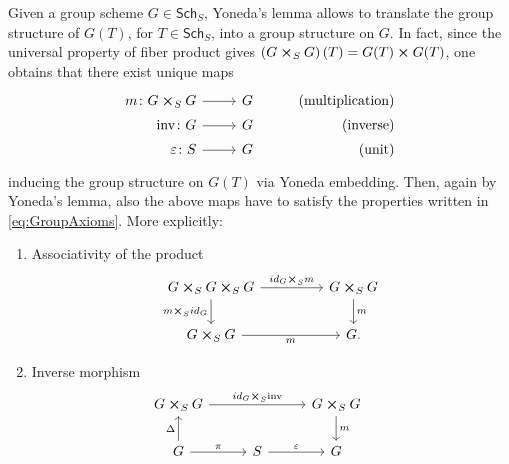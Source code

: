 \documentclass[../Main]{subfiles}
\begin{document}
\begin{rem}[]\label{rem:StructuralMorphisms}
	Given a group scheme $G \in \mathsf{Sch}_{ S }$, Yoneda's lemma allows to translate
	the group structure of $G(T)$, for $T \in \mathsf{Sch}_{ S }$, into a group structure on $G$.
	In fact, since the universal property of
	fiber product gives $\left( G \cross_{ S } G \right)(T) = G(T) \cross G(T)$,
	one obtains that there exist unique maps
	\begin{equation}
			\begin{tikzcd}[row sep = 0ex
         ,/tikz/column 1/.append style={anchor=base east}
         ,/tikz/column 2/.append style={anchor=base west}
         ,/tikz/column 3/.append style={anchor=base east}]
			m\colon G \cross_{ S } G \arrow[r, "", rightarrow] &
			G & \text{(multiplication)} \\
			\mathrm{inv}\colon G \arrow[r, "", rightarrow] &
			G & \text{(inverse)} \\
			\varepsilon \colon S \arrow[r, "", rightarrow] &
			G & \text{(unit)} 
		\end{tikzcd}
	\end{equation} 
	inducing the group structure on $G(T)$ via Yoneda embedding.
	Then, again by Yoneda's lemma, also the above maps have to
	satisfy the properties written in 
	\eqref{eq:GroupAxioms}.
	More explicitly:
	\begin{enumerate}
		\item Associativity of the product
			\begin{equation}
			\begin{tikzcd}[column sep=4.5em]
				G \cross_{ S } G \cross_{ S } G 
				\arrow[r, "id_G \cross_S m", rightarrow] 
				\arrow[d, "m \cross_S id_G"', rightarrow] &
				G \cross_{ S } G \arrow[d, "m", rightarrow] \\
				G \cross_{ S } G \arrow[r, "m"', rightarrow] &
				G.
			\end{tikzcd}
			\end{equation} 
		\item Inverse morphism 
			\begin{equation*}
			\begin{tikzcd}[column sep=2.7em]
				G \cross_{ S } G \arrow[rr, "id_G \cross_S \mathrm{inv}", rightarrow] & &
				G \cross_{ S } G \arrow[d, "m", rightarrow] \\
				G \arrow[u, "\Delta", rightarrow] 
				\arrow[r, "\pi", rightarrow] &
				S \arrow[r, "\varepsilon", rightarrow] & 
				G
			\end{tikzcd}
			\qquad
			\begin{tikzcd}[column sep=2.7em]

\end{tikzcd}
\end{equation*}
\end{enumerate}
\end{rem}
\end{document}

